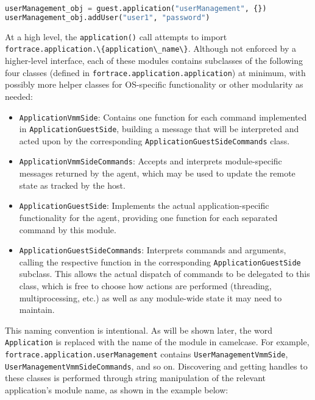 \documentclass[letterpaper,12pt]{report}
\def\tightlist{}
\newcommand{\passthrough}[1]{#1}
\begin{document}
\begin{lstlisting}[language=Python]
userManagement_obj = guest.application("userManagement", {})
userManagement_obj.addUser("user1", "password")
\end{lstlisting}

At a high level, the \passthrough{\lstinline!application()!} call
attempts to import
\passthrough{\lstinline!fortrace.application.\{application\_name\}!}.
Although not enforced by a higher-level interface, each of these modules
contains subclasses of the following four classes (defined in
\passthrough{\lstinline!fortrace.application.application!}) at minimum,
with possibly more helper classes for OS-specific functionality or other
modularity as needed:

\begin{itemize}
\tightlist
\item
  \passthrough{\lstinline!ApplicationVmmSide!}: Contains one function
  for each command implemented in
  \passthrough{\lstinline!ApplicationGuestSide!}, building a message
  that will be interpreted and acted upon by the corresponding
  \passthrough{\lstinline!ApplicationGuestSideCommands!} class.
\item
  \passthrough{\lstinline!ApplicationVmmSideCommands!}: Accepts and
  interprets module-specific messages returned by the agent, which may
  be used to update the remote state as tracked by the host.
\item
  \passthrough{\lstinline!ApplicationGuestSide!}: Implements the actual
  application-specific functionality for the agent, providing one
  function for each separated command by this module.
\item
  \passthrough{\lstinline!ApplicationGuestSideCommands!}: Interprets
  commands and arguments, calling the respective function in the
  corresponding \passthrough{\lstinline!ApplicationGuestSide!} subclass.
  This allows the actual dispatch of commands to be delegated to this
  class, which is free to choose how actions are performed (threading,
  multiprocessing, etc.) as well as any module-wide state it may need to
  maintain.
\end{itemize}

This naming convention is intentional. As will be shown later, the word
\passthrough{\lstinline!Application!} is replaced with the name of the
module in camelcase. For example,
\passthrough{\lstinline!fortrace.application.userManagement!} contains
\passthrough{\lstinline!UserManagementVmmSide!},
\passthrough{\lstinline!UserManagementVmmSideCommands!}, and so on.
Discovering and getting handles to these classes is performed through
string manipulation of the relevant application's module name, as shown
in the example below:
\end{document}
